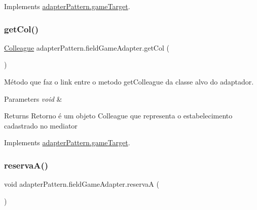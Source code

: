 Implements \mbox{\hyperlink{interfaceadapter_pattern_1_1game_target_a32fce3f3dd420116a031b051f2464304}{adapter\+Pattern.\+game\+Target}}.

\mbox{\label{classadapter_pattern_1_1field_game_adapter_acdddca2c22e22b6b52dcd4d9d6cd06fc}} 
\subsubsection{\texorpdfstring{getCol()}{getCol()}}
{\footnotesize\ttfamily \mbox{\hyperlink{classmediator_pattern_1_1_colleague}{Colleague}} adapter\+Pattern.\+field\+Game\+Adapter.\+get\+Col (\begin{DoxyParamCaption}{ }\end{DoxyParamCaption})}



Método que faz o link entre o metodo get\+Colleague da classe alvo do adaptador. 


\begin{DoxyParams}{Parameters}
{\em void} & \\
\hline
\end{DoxyParams}
\begin{DoxyReturn}{Returns}
Retorno é um objeto Colleague que representa o estabelecimento cadastrado no mediator 
\end{DoxyReturn}


Implements \mbox{\hyperlink{interfaceadapter_pattern_1_1game_target_ad3fc8b4c4a732bcc875071ed0c081261}{adapter\+Pattern.\+game\+Target}}.

\mbox{\label{classadapter_pattern_1_1field_game_adapter_aef66fcf4766fd5edd94bf729b02e5a2a}} 
\subsubsection{\texorpdfstring{reservaA()}{reservaA()}}
{\footnotesize\ttfamily void adapter\+Pattern.\+field\+Game\+Adapter.\+reservaA (\begin{DoxyParamCaption}{ }\end{DoxyParamCaption})}



